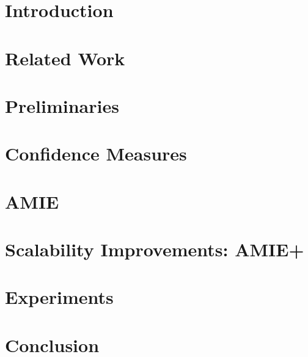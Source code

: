 \documentclass[twocolumn]{article}          %
\begin{document}
\newpage

\section{Introduction}
\label{sec:introduction}



\section{Related Work}
\label{sec:relatedWork}



\section{Preliminaries}
\label{sec:preliminaries}



\section{Confidence Measures}
\label{sec:pca}



\section{AMIE}
\label{sec:alg}



\section{Scalability Improvements: AMIE+}
\label{sec:improvements}



\section{Experiments}
\label{sec:experiments}



\section{Conclusion}
\label{sec:conclusion}


\balance
\end{document}
